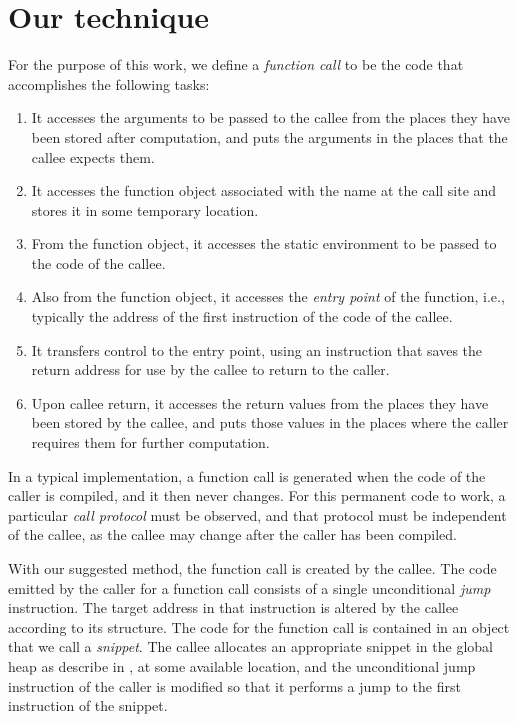 \section{Our technique}
\label{sec-our-technique}

For the purpose of this work, we define a \emph{function call} to be
the code that accomplishes the following tasks:

\begin{enumerate}
\item It accesses the arguments to be passed to the callee from the
  places they have been stored after computation, and puts the
  arguments in the places that the callee expects them.
\item It accesses the function object associated with the name at the
  call site and stores it in some temporary location.
\item From the function object, it accesses the static environment to
  be passed to the code of the callee.
\item Also from the function object, it accesses the \emph{entry
  point} of the function, i.e., typically the address of the first
  instruction of the code of the callee.
\item It transfers control to the entry point, using an instruction
  that saves the return address for use by the callee to return to the
  caller.
\item Upon callee return, it accesses the return values from the places
  they have been stored by the callee, and puts those values in the
  places where the caller requires them for further computation.
\end{enumerate}

In a typical implementation, a function call is generated when the
code of the caller is compiled, and it then never changes.  For this
permanent code to work, a particular \emph{call protocol} must be
observed, and that protocol must be independent of the callee, as the
callee may change after the caller has been compiled.

With our suggested method, the function call is created by the
callee.  The code emitted by the caller for a function call consists
of a single unconditional \emph{jump} instruction.  The target address
in that instruction is altered by the callee according to its
structure.  The code for the function call is contained in an object
that we call a \emph{snippet}.  The callee allocates an appropriate
snippet in the global heap as describe in ,
at some available location, and the unconditional jump instruction of
the caller is modified so that it performs a jump to the first
instruction of the snippet.

